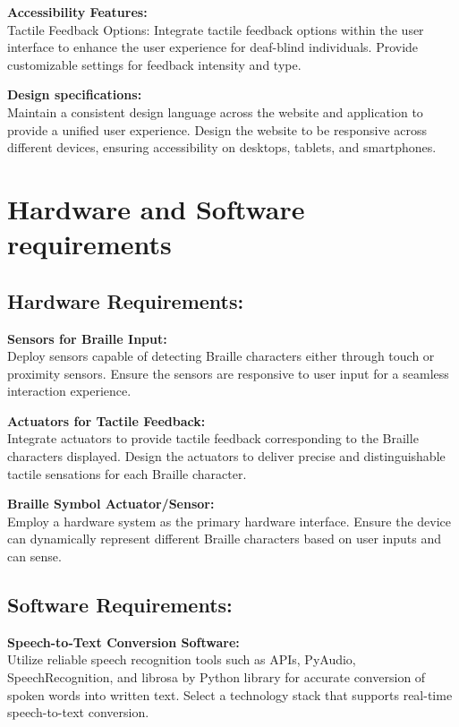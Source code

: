 \documentclass[12pt,a4paper]{report}
\begin{document}
\noindent\textbf{Accessibility Features:}\\
Tactile Feedback Options:
Integrate tactile feedback options within the user interface to enhance the user experience for deaf-blind individuals. Provide customizable settings for feedback intensity and type.

\noindent\textbf{Design specifications:}\\
Maintain a consistent design language across the website and application to provide a unified user experience. Design the website to be responsive across different devices, ensuring accessibility on desktops, tablets, and smartphones.


\section{Hardware and Software requirements}
\subsection{Hardware Requirements:}

\textbf{Sensors for Braille Input:}\\
Deploy sensors capable of detecting Braille characters either through touch or proximity sensors. Ensure the sensors are responsive to user input for a seamless interaction experience.

\noindent\textbf{Actuators for Tactile Feedback:}\\
Integrate actuators to provide tactile feedback corresponding to the Braille characters displayed. Design the actuators to deliver precise and distinguishable tactile sensations for each Braille character.

\noindent\textbf{Braille Symbol Actuator/Sensor:}\\
Employ a hardware system as the primary hardware interface. Ensure the device can dynamically represent different Braille characters based on user inputs and can sense.

\subsection{Software Requirements:}

\textbf{Speech-to-Text Conversion Software:}\\
Utilize reliable speech recognition tools such as APIs, PyAudio, SpeechRecognition, and librosa by Python library for accurate conversion of spoken words into written text. Select a technology stack that supports real-time speech-to-text conversion.
\end{document}
